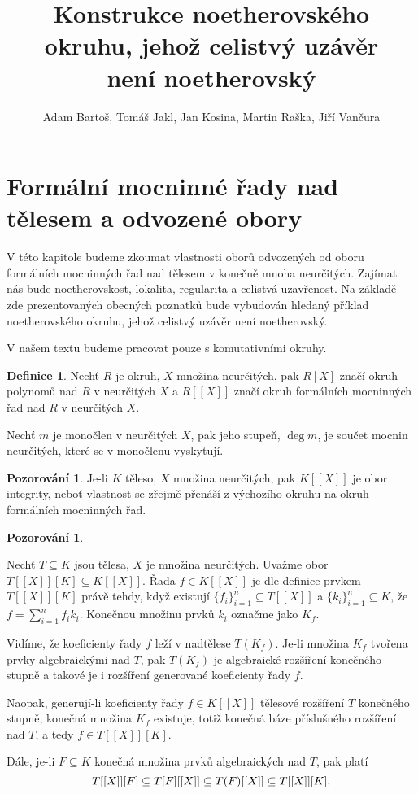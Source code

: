 \documentclass[11pt,a4paper]{article}
\title{Konstrukce noetherovského okruhu, jehož celistvý uzávěr\\ není noetherovský}
\author{Adam Bartoš, Tomáš Jakl, Jan Kosina, Martin Raška, Jiří Vančura}
\newcommand*{\ml}[1]{\[\textstyle\let\displaystyle\textstyle#1\]}	%
\newcounter{numb}
\theoremstyle{definition}
\newtheorem*{definice}{Definice}
\newtheorem{pozorovani}[numb]{Pozorování}
\theoremstyle{plain}
\begin{document}
\maketitle


\section{Formální mocninné řady nad tělesem a odvozené obory}

V této kapitole budeme zkoumat vlastnosti oborů odvozených od oboru formálních mocninných řad nad tělesem v konečně mnoha neurčitých. Zajímat nás bude noetherovskost, lokalita, regularita a celistvá uzavřenost. Na základě zde prezentovaných obecných poznatků bude vybudován hledaný příklad noetherovského okruhu, jehož celistvý uzávěr není noetherovský.

V našem textu budeme pracovat pouze s komutativními okruhy.

\begin{definice}
	Nechť $R$ je okruh, $X$ množina neurčitých, pak $R[X]$ značí okruh polynomů nad $R$ v neurčitých $X$ a $R[[X]]$ značí okruh formálních mocninných řad nad $R$ v neurčitých $X$.
	
	Nechť $m$ je monočlen v neurčitých $X$, pak jeho stupeň, $\deg m$, je součet mocnin neurčitých, které se v monočlenu vyskytují.
\end{definice}

\begin{pozorovani}
	Je-li $K$ těleso, $X$ množina neurčitých, pak $K[[X]]$ je obor integrity, neboť vlastnost  se zřejmě přenáší z výchozího okruhu na okruh formálních mocninných řad.
\end{pozorovani}

\begin{pozorovani} \label{thm:TXK}
	\newcommand*{\I}{_{i = 1}^n}

	Nechť $T \subseteq K$ jsou tělesa, $X$ je množina neurčitých. Uvažme obor $T[[X]][K] \subseteq K[[X]]$. Řada $f \in K[[X]]$ je dle definice prvkem $T[[X]][K]$ právě tehdy, když existují $\{f_i\}\I \subseteq T[[X]]$ a $\{k_i\}\I \subseteq K$, že $f = \sum\I f_i k_i$. Konečnou množinu prvků $k_i$ označme jako $K_f$.

	Vidíme, že koeficienty řady $f$ leží v nadtělese $T(K_f)$. Je-li množina $K_f$ tvořena prvky algebraickými nad $T$, pak $T(K_f)$ je algebraické rozšíření konečného stupně a takové je i rozšíření generované koeficienty řady $f$.

	Naopak, generují-li koeficienty řady $f \in K[[X]]$ tělesové rozšíření $T$ konečného stupně, konečná množina $K_f$ existuje, totiž konečná báze příslušného rozšíření nad $T$, a tedy $f \in T[[X]][K]$.

	Dále, je-li $F \subseteq K$ konečná množina prvků algebraických nad $T$, pak platí
	\ml{
		T[[X]][F] \subseteq T[F][[X]] \subseteq T(F)[[X]] \subseteq T[[X]][K].
	}
\end{pozorovani}
\end{document}
